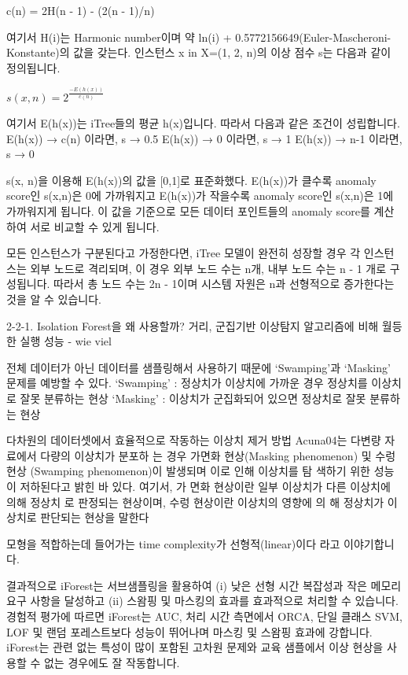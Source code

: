                         c(n) = 2H(n - 1) - (2(n - 1)/n)

                    여기서 H(i)는 Harmonic number이며 약 ln(i) + 0.5772156649(Euler-Mascheroni-Konstante)의 값을 갖는다. 인스턴스 x in X=(1, 2, n)의 이상 점수 s는 다음과 같이 정의됩니다.

                        $s(x,n) = 2^\frac{-E(h(x))}{c(n)}$

                    여기서 E(h(x))는 iTree들의 평균 h(x)입니다. 따라서 다음과 같은 조건이 성립합니다.
                        E(h(x)) → c(n) 이라면, s → 0.5
                        E(h(x)) → 0 이라면, s → 1
                        E(h(x)) → n-1 이라면, s → 0

                    s(x, n)을 이용해 E(h(x))의 값을 [0,1]로 표준화했다. E(h(x))가 클수록 anomaly score인 s(x,n)은 0에 가까워지고 E(h(x))가 작을수록 anomaly score인 s(x,n)은 1에 가까워지게 됩니다. 이 값을 기준으로 모든 데이터 포인트들의 anomaly score를 계산하여 서로 비교할 수 있게 됩니다.


                    


                모든 인스턴스가 구분된다고 가정한다면, iTree 모델이 완전히 성장할 경우 각 인스턴스는 외부 노드로 격리되며, 이 경우 외부 노드 수는 n개, 내부 노드 수는 n - 1 개로 구성됩니다. 따라서 총 노드 수는 2n - 1이며 시스템 자원은 n과 선형적으로 증가한다는 것을 알 수 있습니다.

                2-2-1. Isolation Forest을 왜 사용할까?
                거리, 군집기반 이상탐지 알고리즘에 비해 월등한 실행 성능 - wie viel
                
                전체 데이터가 아닌 데이터를 샘플링해서 사용하기 때문에 ‘Swamping’과 ‘Masking’ 문제를 예방할 수 있다.
                    ‘Swamping’ : 정상치가 이상치에 가까운 경우 정상치를 이상치로 잘못 분류하는 현상
                    ‘Masking’ : 이상치가 군집화되어 있으면 정상치로 잘못 분류하는 현상

                다차원의 데이터셋에서 효율적으로 작동하는 이상치 제거 방법
                Acuna04는 다변량 자료에서 다량의 이상치가 분포하
                는 경우 가면화 현상(Masking phenomenon) 및 수렁 현상
                (Swamping phenomenon)이 발생되며 이로 인해 이상치를 탐
                색하기 위한 성능이 저하된다고 밝힌 바 있다. 여기서, 가
                면화 현상이란 일부 이상치가 다른 이상치에 의해 정상치
                로 판정되는 현상이며, 수렁 현상이란 이상치의 영향에 의
                해 정상치가 이상치로 판단되는 현상을 말한다
            

                모형을 적합하는데 들어가는 time complexity가 선형적(linear)이다 라고 이야기합니다.

                결과적으로 iForest는 서브샘플링을 활용하여 (i) 낮은 선형 시간 복잡성과 작은 메모리 요구 사항을 달성하고 (ii) 스왐핑 및 마스킹의 효과를 효과적으로 처리할 수 있습니다. 경험적 평가에 따르면 iForest는 AUC, 처리 시간 측면에서 ORCA, 단일 클래스 SVM, LOF 및 랜덤 포레스트보다 성능이 뛰어나며 마스킹 및 스왐핑 효과에 강합니다. iForest는 관련 없는 특성이 많이 포함된 고차원 문제와 교육 샘플에서 이상 현상을 사용할 수 없는 경우에도 잘 작동합니다.
                
                
                
            